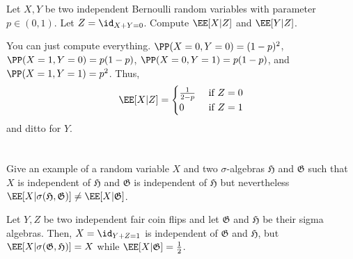 \documentclass[11pt, headheight=30pt]{scrartcl}
\begin{document}
\section{}
\begin{prob*}
    Let $X, Y$ be two independent Bernoulli random variables with parameter $p \in (0, 1)$.
    Let $Z = \id_{X+Y = 0}$.
    Compute $\EE[X |Z]$ and $\EE[Y |Z]$.
\end{prob*}
You can just compute everything. $\PP(X = 0, Y = 0) = (1-p)^2$,
$\PP(X = 1, Y = 0) = p(1-p)$, $\PP(X = 0, Y = 1) = p(1-p)$,
and $\PP(X = 1, Y = 1) = p^2$. Thus,
\[
    \EE[X | Z] = \begin{cases}
        \frac{1}{2 - p} &\text{ if } Z = 0\\
        0 &\text{ if } Z = 1
    \end{cases}
\]
and ditto for $Y$.

\section{}
\begin{prob*}
    Give an example of a random variable $X$ and two $\sigma$-algebras $\mathfrak{H}$ and $\mathfrak{G}$ such that $X$ is
    independent of $\mathfrak{H}$ and $\mathfrak{G}$ is independent of $\mathfrak{H}$ but nevertheless
    $\EE[X | \sigma(\mathfrak{H}, \mathfrak{G})] \neq \EE[X | \mathfrak{G}]$.
\end{prob*}

Let $Y, Z$ be two independent fair coin flips and let $\mathfrak{G}$ and $\mathfrak{H}$ be
their sigma algebras. Then, $X = \id_{Y + Z = 1}$ is independent of $\mathfrak{G}$ and $\mathfrak{H}$,
but $\EE[X | \sigma(\mathfrak{G}, \mathfrak{H})] = X$ while $\EE[X | \mathfrak{G}] = \frac{1}{2}$.
\end{document}
